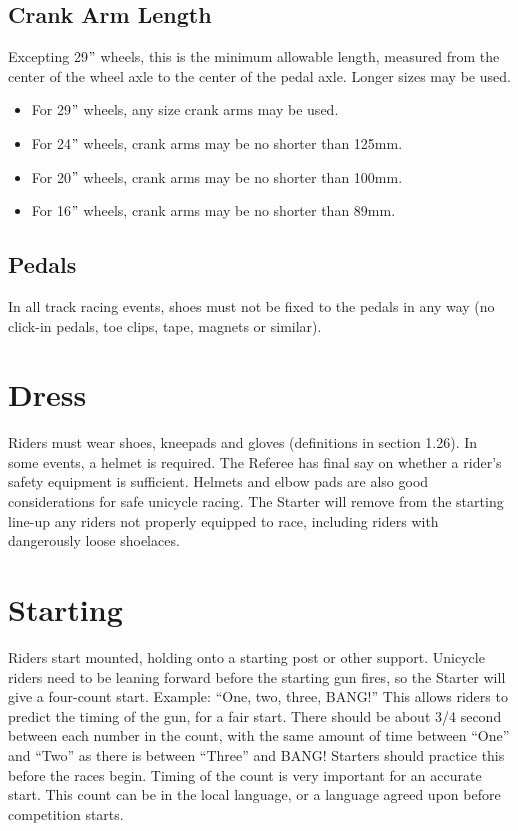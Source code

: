 \subsection{Crank Arm Length}
Excepting 29$"$ wheels, this is the minimum allowable length, measured from the center of the wheel axle to the center of the pedal axle.
Longer sizes may be used.
\begin{itemize}
\item For 29$"$ wheels, any size crank arms may be used.
\item For 24$"$ wheels, crank arms may be no shorter than 125mm.
\item For 20$"$ wheels, crank arms may be no shorter than 100mm.
\item For 16$"$ wheels, crank arms may be no shorter than 89mm.
\end{itemize}

\subsection{Pedals}
In all track racing events, shoes must not be fixed to the pedals in any way (no click-in pedals, toe clips, tape, magnets or similar).

\section{Dress}
Riders must wear shoes, kneepads and gloves (definitions in section 1.26). %
In some events, a helmet is required.
The Referee has final say on whether a rider's safety equipment is sufficient.
Helmets and elbow pads are also good considerations for safe unicycle racing.
The Starter will remove from the starting line-up any riders not properly equipped to race, including riders with dangerously loose shoelaces.

\section{Starting}
Riders start mounted, holding onto a starting post or other support.
Unicycle riders need to be leaning forward before the starting gun fires, so the Starter will give a four-count start.
Example: ``One, two, three, BANG!'' This allows riders to predict the timing of the gun, for a fair start.
There should be about 3/4 second between each number in the count, with the same amount of time between ``One'' and ``Two'' as there is between ``Three'' and BANG! Starters should practice this before the races begin.
Timing of the count is very important for an accurate start.
This count can be in the local language, or a language agreed upon before competition starts.

